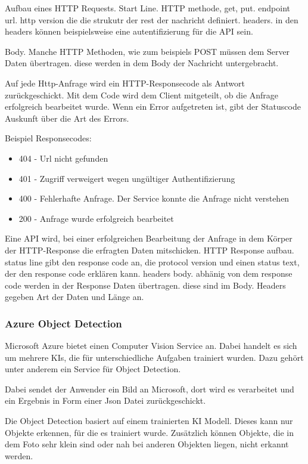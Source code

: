 Aufbau eines HTTP Requests. Start Line. HTTP methode, get, put. endpoint url. http version die die strukutr der rest der nachricht definiert.
headers. in den headers können beispielsweise eine autentifizierung für die API sein.

Body. Manche HTTP Methoden, wie zum beispiels POST müssen dem Server Daten übertragen. diese werden in dem Body der Nachricht untergebracht.
  
Auf jede Http-Anfrage wird ein HTTP-Responsecode als Antwort zurückgeschickt. Mit dem Code wird dem Client mitgeteilt, ob die Anfrage erfolgreich bearbeitet wurde. Wenn ein Error aufgetreten ist, gibt der Statuscode Auskunft über die Art des Errors. 

Beispiel Responsecodes:
\begin{itemize}
	\item 404 - Url nicht gefunden
	\item 401 - Zugriff verweigert wegen ungültiger Authentifizierung
	\item 400 - Fehlerhafte Anfrage. Der Service konnte die Anfrage nicht verstehen
	\item 200 - Anfrage wurde erfolgreich bearbeitet
\end{itemize}

Eine API wird, bei einer erfolgreichen Bearbeitung der Anfrage in dem Körper der HTTP-Response die erfragten Daten mitschicken.
HTTP Response aufbau.
status line gibt den response code an, die protocol version und einen status text, der den response code erklären kann.
headers
body. abhänig von dem response code werden in der Response Daten übertragen. diese sind im Body.
Headers gegeben Art der Daten und Länge an.


\subsubsection{Azure Object Detection}
Microsoft Azure bietet einen Computer Vision Service an. Dabei handelt es sich um mehrere KIs, die für unterschiedliche Aufgaben trainiert wurden. Dazu gehört unter anderem ein Service für Object Detection.

Dabei sendet der Anwender ein Bild an Microsoft, dort wird es verarbeitet und ein Ergebnis in Form einer Json Datei zurückgeschickt.\citep{getAzure,whatIsAzure,objDetectAzure,Azure302Doc}

Die Object Detection basiert auf einem trainierten KI Modell. Dieses kann nur Objekte erkennen, für die es trainiert wurde.
Zusätzlich können Objekte, die in dem Foto sehr klein sind oder nah bei anderen Objekten liegen, nicht erkannt werden.\citep{azureobjdetec}

